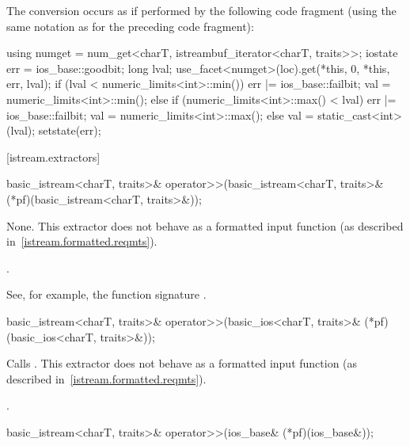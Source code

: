 \begin{itemdescr}
\pnum
The conversion occurs as if performed by the following code fragment
(using the same notation as for the preceding code fragment):
\begin{codeblock}
using numget = num_get<charT, istreambuf_iterator<charT, traits>>;
iostate err = ios_base::goodbit;
long lval;
use_facet<numget>(loc).get(*this, 0, *this, err, lval);
if (lval < numeric_limits<int>::min()) {
  err |= ios_base::failbit;
  val = numeric_limits<int>::min();
} else if (numeric_limits<int>::max() < lval) {
  err |= ios_base::failbit;
  val = numeric_limits<int>::max();
}  else
  val = static_cast<int>(lval);
setstate(err);
\end{codeblock}
\end{itemdescr}

[istream.extractors]{}

%
\begin{itemdecl}
basic_istream<charT, traits>&
  operator>>(basic_istream<charT, traits>& (*pf)(basic_istream<charT, traits>&));
\end{itemdecl}

\begin{itemdescr}
\pnum
\effects
None.
This extractor does not behave as a formatted input function
(as described in~\ref{istream.formatted.reqmts}).

\pnum
\returns
{}.%
%
\begin{footnote}
See, for example, the function signature
.
\end{footnote}
\end{itemdescr}

%
\begin{itemdecl}
basic_istream<charT, traits>&
  operator>>(basic_ios<charT, traits>& (*pf)(basic_ios<charT, traits>&));
\end{itemdecl}

\begin{itemdescr}
\pnum
\effects
Calls
.
This extractor does not behave as a formatted input function
(as described in~\ref{istream.formatted.reqmts}).

\pnum
\returns
{}.
\end{itemdescr}

%
\begin{itemdecl}
basic_istream<charT, traits>& operator>>(ios_base& (*pf)(ios_base&));
\end{itemdecl}

